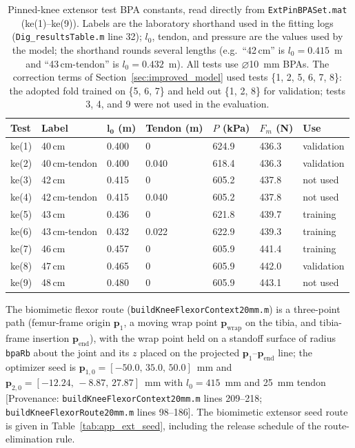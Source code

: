 \begin{table}[htbp]
\caption{Pinned-knee extensor test BPA constants, read directly from \texttt{ExtPinBPASet.mat} (ke(1)--ke(9)). Labels are the laboratory shorthand used in the fitting logs (\texttt{Dig\_resultsTable.m} line 32); $l_{0}$, tendon, and pressure are the values used by the model; the shorthand rounds several lengths (e.g.\ ``42\,cm'' is $l_{0}=0.415$~m and ``43\,cm-tendon'' is $l_{0}=0.432$~m). All tests use $\diameter$\qty{10}{\mm} BPAs. The correction terms of Section~\ref{sec:improved_model} used tests \{1, 2, 5, 6, 7, 8\}: the adopted fold trained on \{5, 6, 7\} and held out \{1, 2, 8\} for validation; tests 3, 4, and 9 were not used in the evaluation.}
\label{tab:app_extpin_tests}
\begin{tabular}{@{}lllllll@{}}
\toprule
\textbf{Test} & \textbf{Label} & $\boldsymbol{l_{0}}$ (m) & Tendon (m) & $P$ (kPa) & $F_{m}$ (N) & \textbf{Use} \\
\midrule
ke(1) & 40\,cm          & 0.400 & 0     & 624.9 & 436.3 & validation \\
ke(2) & 40\,cm-tendon   & 0.400 & 0.040 & 618.4 & 436.3 & validation \\
ke(3) & 42\,cm          & 0.415 & 0     & 605.2 & 437.8 & not used \\
ke(4) & 42\,cm-tendon   & 0.415 & 0.040 & 605.2 & 437.8 & not used \\
ke(5) & 43\,cm          & 0.436 & 0     & 621.8 & 439.7 & training \\
ke(6) & 43\,cm-tendon   & 0.432 & 0.022 & 622.9 & 439.3 & training \\
ke(7) & 46\,cm          & 0.457 & 0     & 605.9 & 441.4 & training \\
ke(8) & 47\,cm          & 0.465 & 0     & 605.9 & 442.0 & validation \\
ke(9) & 48\,cm          & 0.480 & 0     & 605.9 & 443.1 & not used \\
\bottomrule
\end{tabular}
\end{table}

The biomimetic flexor route (\texttt{buildKneeFlexorContext20mm.m}) is a three-point path (femur-frame origin $\mathbf{p}_{1}$, a moving wrap point $\mathbf{p}_{\text{wrap}}$ on the tibia, and tibia-frame insertion $\mathbf{p}_{\text{end}}$), with the wrap point held on a standoff surface of radius \texttt{bpaRb} about the joint and its $z$ placed on the projected $\mathbf{p}_{1}$--$\mathbf{p}_{\text{end}}$ line; the optimizer seed is $\mathbf{p}_{1,0} = [-50.0,\,35.0,\,50.0]$~mm and $\mathbf{p}_{2,0} = [-12.24,\,-8.87,\,27.87]$~mm with $l_{0} = 415$~mm and 25~mm tendon [Provenance: \texttt{buildKneeFlexorContext20mm.m} lines 209--218; \texttt{buildKneeFlexorRoute20mm.m} lines 98--186]. The biomimetic extensor seed route is given in Table~\ref{tab:app_ext_seed}, including the release schedule of the route-elimination rule.

